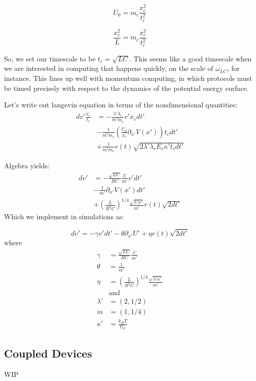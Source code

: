 \documentclass[paper=a4, twocolumn, fontsize=10pt]{article} %
\numberwithin{equation}{section} %
\numberwithin{figure}{section} %
\numberwithin{table}{section} %
\begin{document}
\[ U_0 = m_c \frac{ x^2_c}{t^2_c} \]

\[ \frac{x_c^2}{L} = m_c \frac{ x^2_c}{t^2_c} \]

So, we set our timescale to be $t_c = \sqrt{LC} $. This seems like a good timescale when we are interested in computing that happens quickly, on the scale of $\omega_{LC}$, for instance. This lines up well with momentum computing, in which protocols must be timed precisely with respect to the dynamics of the potential energy surface.


Let's write out langevin equation in terms of the nondimensional quantities:
\begin{align*}
dv' \frac{x_c}{t_c} &= -\frac{\lambda' \lambda_c}{m' m_c} v' x_c  dt' \\
 &- \frac{1}{m' m_c} \left(\frac{U_0}{x_c} \partial_{x'} V(x')\right)  t_c dt' \\
  &+ \frac{1}{m'm_c} r(t)\sqrt{2\lambda'\lambda_c E_c \kappa' t_c dt'}
\end{align*}
    
Algebra yields:
\begin{align*}
dv' &= -\frac{\sqrt{LC} }{ RC} \frac{\lambda'}{m'} v' dt' \\
&- \frac{1 }{ m'}  \partial_{x'} V(x') dt' \\
&+ \left(  \frac{L}{R^2 C} \right)^{1/4} \frac{\sqrt{\lambda'\kappa'}}{m'} r(t) \sqrt {2 dt'}
\end{align*}
Which we implement in simulations as:

 \[ dv' = -\gamma v' dt' - \theta \partial_{x'} U' + \eta r(t) \sqrt{2dt'} \]
where
\begin{align*}
    \gamma &=  \frac{\sqrt{LC} }{ RC} \frac{\lambda'}{m'}  \\
    \theta &= \frac{1 }{ m'} \\
    \eta &= \left(  \frac{L}{R^2 C} \right)^{1/4} \frac{\sqrt{\lambda'\kappa'}}{m'} \\
    &\text{and} \\
    \lambda' &= (2, 1/2) \\
    m &= ( 1, 1/4) \\
    \kappa' &= \frac{k_B T}{U_0}
\end{align*}

\subsection{Coupled Devices}

WIP
\end{document}
